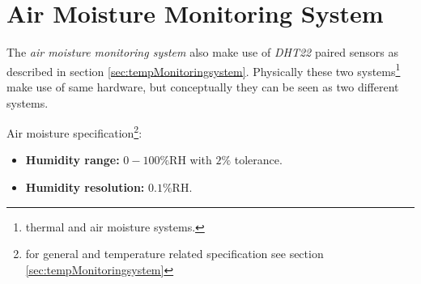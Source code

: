 \documentclass[../../main]{subfiles}
\begin{document}
\section{Air Moisture Monitoring System} \label{sec:}


The \emph{air moisture monitoring system} also make use of \emph{DHT22} paired sensors
as described in section \ref{sec:tempMonitoringsystem}. Physically these two
systems\footnote{thermal and air moisture systems.} make use of same hardware,
but conceptually they can be seen as two different systems.

Air moisture specification\footnote{for general and temperature related specification
see section \ref{sec:tempMonitoringsystem}}:

\begin{itemize}
    \item \textbf{Humidity range:} $0-100\%$RH with $2\%$ tolerance.
    \item \textbf{Humidity resolution:} $0.1\%$RH.
\end{itemize}


\end{document}
